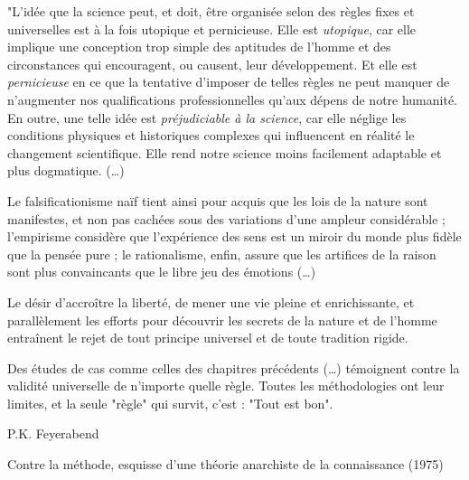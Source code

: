 \thispagestyle{preface}
\vspace{120pt}
\begin{tirade}
"L’idée que la science peut, et doit, être organisée selon des règles fixes et
universelles est à la fois utopique et pernicieuse. Elle est \emph{utopique},
car elle implique une conception trop simple des aptitudes de l’homme et des
circonstances qui encouragent, ou causent, leur développement. Et elle est
\emph{pernicieuse} en ce que la tentative d’imposer de telles règles ne peut
manquer de n’augmenter nos qualifications professionnelles qu’aux dépens de notre
humanité.
En outre, une telle idée est \emph{préjudiciable à la science}, car elle néglige
les conditions physiques et historiques complexes qui influencent en réalité le
changement scientifique. Elle rend notre science moins facilement adaptable et
plus dogmatique. (\ldots)


Le falsificationisme naïf tient ainsi pour acquis que les lois de la nature
sont manifestes, et non pas cachées sous des variations d’une ampleur
considérable ; l’empirisme considère que l’expérience des sens est un miroir du
monde plus fidèle que la pensée pure ; le rationalisme, enfin, assure que les
artifices de la raison sont plus convaincants que le libre jeu des émotions
(\ldots)

Le désir d’accroître la liberté, de mener une vie pleine et enrichissante, et
parallèlement les efforts pour découvrir les secrets de la nature et de l’homme
entraînent le rejet de tout principe universel et de toute tradition rigide.


Des études de cas comme celles des chapitres précédents (\ldots)
témoignent contre la validité universelle de n'importe quelle règle. Toutes les
méthodologies ont leur limites, et la seule "règle" qui survit, c'est : "Tout
est bon".
\end{tirade}
\hfill P.K. Feyerabend

\hfill\footnotesize  Contre la méthode, esquisse d’une théorie anarchiste de la
 connaissance (1975)
 \normalsize
